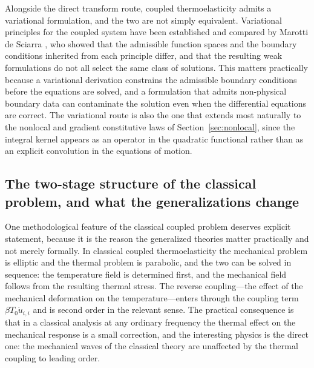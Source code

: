 Alongside the direct transform route, coupled thermoelasticity admits a variational formulation, and the two are not simply equivalent. Variational principles for the coupled system have been established and compared by Marotti de Sciarra \cite{Marotti2013}, who showed that the admissible function spaces and the boundary conditions inherited from each principle differ, and that the resulting weak formulations do not all select the same class of solutions. This matters practically because a variational derivation constrains the admissible boundary conditions before the equations are solved, and a formulation that admits non-physical boundary data can contaminate the solution even when the differential equations are correct. The variational route is also the one that extends most naturally to the nonlocal and gradient constitutive laws of Section~\ref{sec:nonlocal}, since the integral kernel appears as an operator in the quadratic functional rather than as an explicit convolution in the equations of motion.

\subsection{The two-stage structure of the classical problem, and what the generalizations change}
\label{sec:8.10}

One methodological feature of the classical coupled problem deserves explicit statement, because it is the reason the generalized theories matter practically and not merely formally. In classical coupled thermoelasticity the mechanical problem is elliptic and the thermal problem is parabolic, and the two can be solved in sequence: the temperature field is determined first, and the mechanical field follows from the resulting thermal stress. The reverse coupling---the effect of the mechanical deformation on the temperature---enters through the coupling term $\beta T_0 \dot{u}_{i,i}$ and is second order in the relevant sense. The practical consequence is that in a classical analysis at any ordinary frequency the thermal effect on the mechanical response is a small correction, and the interesting physics is the direct one: the mechanical waves of the classical theory are unaffected by the thermal coupling to leading order.

